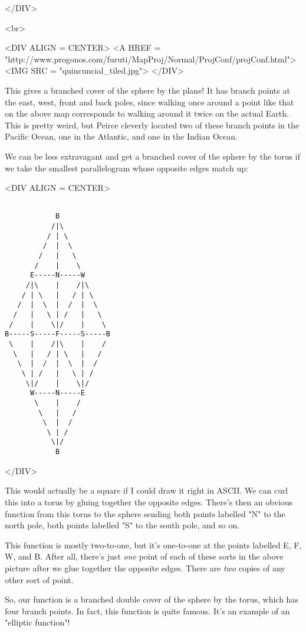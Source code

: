 </DIV>

<br>

<DIV ALIGN = CENTER>
<A HREF = 
"http://www.progonos.com/furuti/MapProj/Normal/ProjConf/projConf.html">
<IMG SRC = "quincuncial_tiled.jpg">
</DIV>

This gives a branched cover of the sphere by the plane!  It 
has branch points at the east, west, front and back poles,
since walking once around a point like that on the above map 
corresponds to walking around it twice on the actual Earth.
This is pretty weird, but Peirce cleverly located two of these
branch points in the Pacific Ocean, one in the Atlantic, and one in 
the Indian Ocean.

We can be less extravagant and get a branched cover of the 
sphere by the torus if we take the smallest parallelogram 
whose opposite edges match up:

<DIV ALIGN = CENTER>

\begin{verbatim}

            B            
           /|\           
          / | \          
         /  |  \         
        /   |   \        
       /    |    \       
      E-----N-----W      
     /|\    |    /|\     
    / | \   |   / | \    
   /  |  \  |  /  |  \   
  /   |   \ | /   |   \  
 /    |    \|/    |    \ 
B-----S-----F-----S-----B
 \    |    /|\    |    / 
  \   |   / | \   |   /  
   \  |  /  |  \  |  /   
    \ | /   |   \ | /    
     \|/    |    \|/     
      W-----N-----E      
       \    |    /       
        \   |   /        
         \  |  /         
          \ | /          
           \|/           
            B            
\end{verbatim}
    
</DIV>

This would actually be a square if I could draw it right in ASCII.
We can curl this into a torus by gluing together the opposite edges. 
There's then an obvious function from this torus to the sphere
sending both points labelled "N" to the north pole, both points 
labelled "S" to the south pole, and so on.  

This function is mostly two-to-one, but it's one-to-one at the 
points labelled E, F, W, and B.  After all, there's just \emph{one}
point of each of these sorts in the above picture after we glue 
together the opposite edges.  There are \emph{two} copies of any other 
sort of point.

So, our function is a branched double cover of the sphere by 
the torus, which has four branch points.  In fact, this function 
is quite famous.  It's an example of an "elliptic function"!   

